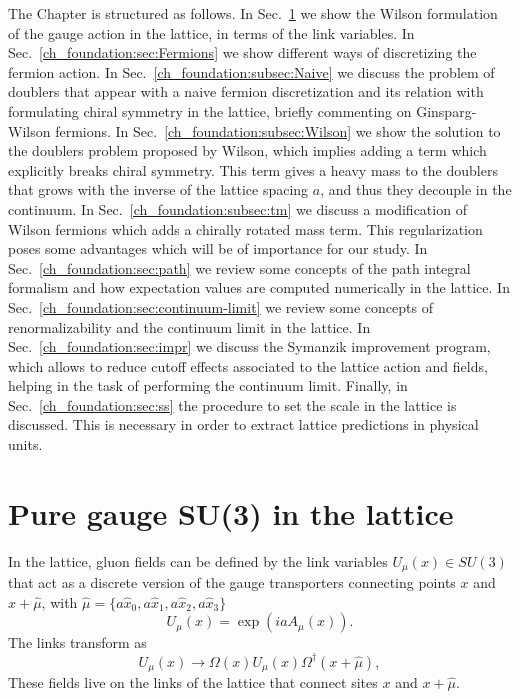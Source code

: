 The Chapter is structured as follows. In Sec.~\ref{ch_foundation:sec:Gauge} we show the Wilson formulation of the gauge action in the lattice, in terms of the link variables. In Sec.~\ref{ch_foundation:sec:Fermions} we show different ways of discretizing the fermion action. In Sec.~\ref{ch_foundation:subsec:Naive} we discuss the problem of doublers that appear with a naive fermion discretization and its relation with formulating chiral symmetry in the lattice, briefly commenting on Ginsparg-Wilson fermions. In Sec.~\ref{ch_foundation:subsec:Wilson} we show the solution to the doublers problem proposed by Wilson, which implies adding a term which explicitly breaks chiral symmetry. This term gives a heavy mass to the doublers that grows with the inverse of the lattice spacing $a$, and thus they decouple in the continuum. In Sec.~\ref{ch_foundation:subsec:tm} we discuss a modification of Wilson fermions which adds a chirally rotated mass term. This regularization poses some advantages which will be of importance for our study. In Sec.~\ref{ch_foundation:sec:path} we review some concepts of the path integral formalism and how expectation values are computed numerically in the lattice. In Sec.~\ref{ch_foundation:sec:continuum-limit} we review some concepts of renormalizability and the continuum limit in the lattice. In Sec.~\ref{ch_foundation:sec:impr} we discuss the Symanzik improvement program, which allows to reduce cutoff effects associated to the lattice action and fields, helping in the task of performing the continuum limit. Finally, in Sec.~\ref{ch_foundation:sec:ss} the procedure to set the scale in the lattice is discussed. This is necessary in order to extract lattice predictions in physical units.


\section{Pure gauge SU(3) in the lattice}
\label{ch_foundation:sec:Gauge}

In the lattice, gluon fields can be defined by the link variables $U_{\mu}(x)\in SU(3)$ that act as a discrete version of the gauge transporters connecting points $x$ and $x+\hat{\mu}$, with $\hat{\mu}=\{a\hat{x}_0,a\hat{x}_1,a\hat{x}_2,a\hat{x}_3\}$
\begin{equation}
\label{ch_foundation:eq:U}
U_{\mu}(x)=\exp\left(iaA_{\mu}(x)\right).
\end{equation}
The links transform as 
\begin{equation}
\label{ch_foundation:eq:U_transf}
U_{\mu}(x)\to\Omega(x)U_{\mu}(x)\Omega^{\dagger}(x+\hat{\mu}),
\end{equation}
These fields live on the links of the lattice that connect sites $x$ and $x+\hat{\mu}$.


